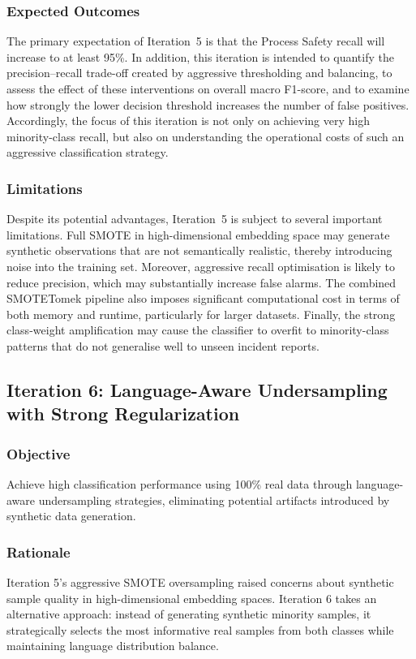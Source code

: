 \documentclass[11pt, titlepage, bibliography=totoc]{scrreprt}
\begin{document}
\subsubsection{Expected Outcomes}
The primary expectation of Iteration~5 is that the Process Safety recall will increase to at least 95\%. In addition, this iteration is intended to quantify the precision--recall trade-off created by aggressive thresholding and balancing, to assess the effect of these interventions on overall macro F1-score, and to examine how strongly the lower decision threshold increases the number of false positives. Accordingly, the focus of this iteration is not only on achieving very high minority-class recall, but also on understanding the operational costs of such an aggressive classification strategy.

\subsubsection{Limitations}
Despite its potential advantages, Iteration~5 is subject to several important limitations. Full SMOTE in high-dimensional embedding space may generate synthetic observations that are not semantically realistic, thereby introducing noise into the training set. Moreover, aggressive recall optimisation is likely to reduce precision, which may substantially increase false alarms. The combined SMOTETomek pipeline also imposes significant computational cost in terms of both memory and runtime, particularly for larger datasets. Finally, the strong class-weight amplification may cause the classifier to overfit to minority-class patterns that do not generalise well to unseen incident reports.

\subsection{Iteration 6: Language-Aware Undersampling with Strong Regularization}

\subsubsection{Objective}
Achieve high classification performance using 100\% real data through language-aware undersampling strategies, eliminating potential artifacts introduced by synthetic data generation.

\subsubsection{Rationale}
Iteration 5's aggressive SMOTE oversampling raised concerns about synthetic sample quality in high-dimensional embedding spaces. Iteration 6 takes an alternative approach: instead of generating synthetic minority samples, it strategically selects the most informative real samples from both classes while maintaining language distribution balance.
\end{document}
